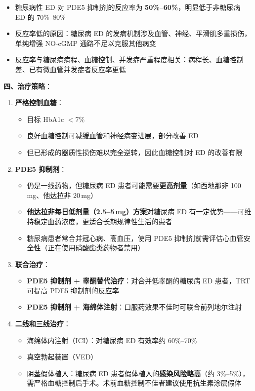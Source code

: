 \begin{itemize}[leftmargin=2cm]
	\item 糖尿病性 ED 对 PDE5 抑制剂的反应率为 \textbf{50\%--60\%}，明显低于非糖尿病 ED 的 70\%--80\%
	\item 反应率低的原因：糖尿病 ED 的发病机制涉及血管、神经、平滑肌多重损伤，单纯增强 NO-cGMP 通路不足以克服其他病变
	\item 反应率与糖尿病病程、血糖控制、并发症严重程度相关：病程长、血糖控制差、已有微血管并发症者反应率更低
\end{itemize}

\vspace{0.5em}
\noindent\textbf{四、治疗策略}：

\begin{enumerate}
	\item \textbf{严格控制血糖}：
	\begin{itemize}
		\item 目标 HbA1c $<7\%$
		\item 良好血糖控制可减缓血管和神经病变进展，部分改善 ED
		\item 但已形成的器质性损伤难以完全逆转，因此血糖控制对 ED 的改善有限
	\end{itemize}

	\item \textbf{PDE5 抑制剂}：
	\begin{itemize}
		\item 仍是一线药物，但糖尿病 ED 患者可能需要\textbf{更高剂量}（如西地那非 100\,mg、他达拉非 20\,mg）
		\item \textbf{他达拉非每日低剂量（2.5--5\,mg）方案}对糖尿病 ED 有一定优势——可维持稳定血药浓度，更适合长期规律性生活的患者
		\item 糖尿病患者常合并冠心病、高血压，使用 PDE5 抑制剂前需评估心血管安全性（正在使用硝酸酯类药物者禁用）
	\end{itemize}

	\item \textbf{联合治疗}：
	\begin{itemize}
		\item \textbf{PDE5 抑制剂 + 睾酮替代治疗}：对合并低睾酮的糖尿病 ED 患者，TRT 可提高 PDE5 抑制剂的反应率
		\item \textbf{PDE5 抑制剂 + 海绵体注射}：口服药效果不佳时可联合前列地尔注射
	\end{itemize}

	\item \textbf{二线和三线治疗}：
	\begin{itemize}
		\item 海绵体内注射（ICI）：对糖尿病 ED 有效率约 60\%--70\%
		\item 真空勃起装置（VED）
		\item 阴茎假体植入：糖尿病 ED 患者假体植入的\textbf{感染风险略高}（约 3\%--5\%），需严格血糖控制后手术。术前血糖控制不佳者建议使用抗生素涂层假体
	\end{itemize}


\end{enumerate}
